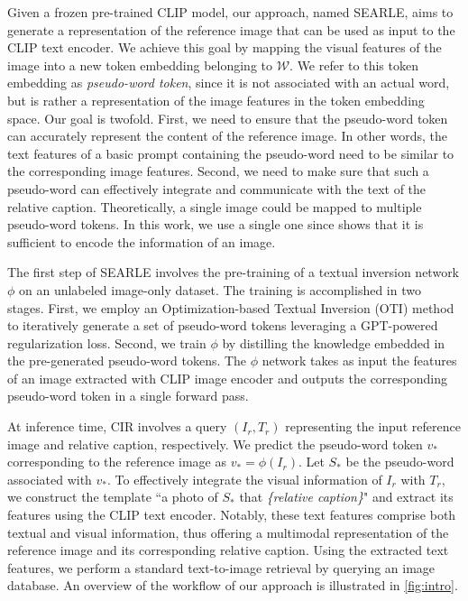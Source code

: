 \documentclass[10pt,twocolumn,letterpaper]{article}
\newcommand{\method}{SEARLE\xspace}
\begin{document}
Given a frozen pre-trained CLIP model, our approach, named \method, aims to generate a representation of the reference image that can be used as input to the CLIP text encoder. We achieve this goal by mapping the visual features of the image into a new token embedding belonging to $\mathcal{W}$. We refer to this token embedding as \textit{pseudo-word token}, since it is not associated with an actual word, but is rather a representation of the image features in the token embedding space. Our goal is twofold. First, we need to ensure that the pseudo-word token can accurately represent the content of the reference image. In other words, the text features of a basic prompt containing the pseudo-word need to be similar to the corresponding image features. Second, we need to make sure that such a pseudo-word can effectively integrate and communicate with the text of the relative caption.
Theoretically, a single image could be mapped to multiple pseudo-word tokens. In this work, we use a single one since \cite{gal2022image} shows that it is sufficient to encode the information of an image.

The first step of \method involves the pre-training of a textual inversion network $\phi$ on an unlabeled image-only dataset. The training is accomplished in two stages. First, we employ an Optimization-based Textual Inversion (OTI) method to iteratively generate a set of pseudo-word tokens leveraging a GPT-powered regularization loss. Second, we train $\phi$ by distilling the knowledge embedded in the pre-generated pseudo-word tokens. The $\phi$ network takes as input the features of an image extracted with CLIP image encoder and outputs the corresponding pseudo-word token in
a single forward pass. 

At inference time, CIR involves a query $(I_r, T_r)$ representing the input reference image and relative caption, respectively. We predict the pseudo-word token $v_*$ corresponding to the reference image as $ v_* = \phi(I_r)$. Let $S_*$ be the pseudo-word associated with $v_*$. To effectively integrate the visual information of $I_r$ with $T_r$, we construct the template ``a photo of $S_*$ that \textit{\{relative caption\}}" and extract its features using the CLIP text encoder. Notably, these text features comprise both textual and visual information, thus offering a multimodal representation of the reference image and its corresponding relative caption. Using the extracted text features, we perform a standard text-to-image retrieval by querying an image database. An overview of the workflow of our approach is illustrated in \cref{fig:intro}.
\end{document}
